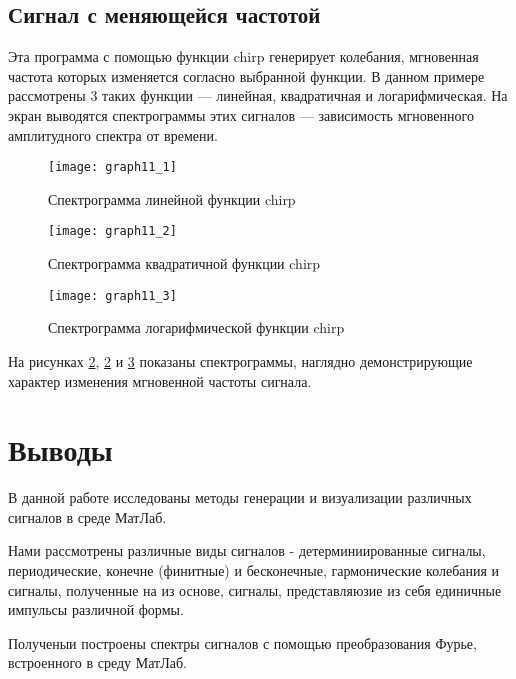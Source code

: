 \subsection{Сигнал с меняющейся частотой}


\parindent=1cm
Эта программа с помощью функции chirp генерирует колебания, мгновенная частота которых изменяется согласно выбранной функции. В данном примере рассмотрены 3 таких функции — линейная, квадратичная и логарифмическая. На экран выводятся спектрограммы этих сигналов — зависимость мгновенного амплитудного спектра от времени.

\begin{figure}[H]
	\begin{center}
		\texttt{[image: graph11\_1]}
		\caption{Спектрограмма линейной функции chirp} 
		\label{pic:graph11_1} %
	\end{center}
\end{figure}
\begin{figure}[H]
	\begin{center}
		\texttt{[image: graph11\_2]}
		\caption{Спектрограмма квадратичной функции chirp} 
		\label{pic:graph11_2} %
	\end{center}
\end{figure}
\begin{figure}[H]
	\begin{center}
		\texttt{[image: graph11\_3]}
		\caption{Спектрограмма логарифмической функции chirp} 
		\label{pic:graph11_3} %
	\end{center}
\end{figure}
На рисунках \ref{pic:graph11_2}, \ref{pic:graph11_2} и \ref{pic:graph11_3} показаны спектрограммы, наглядно демонстрирующие характер изменения мгновенной частоты сигнала.

\section{Выводы}

В данной работе исследованы методы генерации и визуализации различных сигналов в среде МатЛаб. 

Нами рассмотрены различные виды сигналов - детерминиированные сигналы, периодические, конечне (финитные) и бесконечные, гармонические колебания и сигналы, полученные на из основе, сигналы, представляюзие из себя единичные импульсы различной формы.

Полученыи построены спектры сигналов с помощью преобразования Фурье, встроенного в среду МатЛаб.


